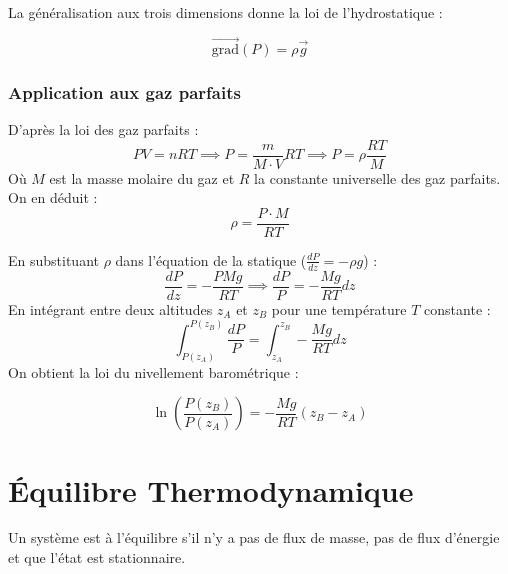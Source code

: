 \documentclass[french]{yLectureNote}
\renewcommand{\vec}{\overrightarrow}
\renewcommand{\vec}{\overrightarrow}
\begin{document}
La généralisation aux trois dimensions donne la loi de l'hydrostatique :

\begin{theorem}
    $$\vec{\text{grad}}(P) = \rho \vec{g}$$
\end{theorem}

\subsubsection{Application aux gaz parfaits}
D'après la loi des gaz parfaits :
\begin{equation}
PV = nRT \implies P = \frac{m}{M \cdot V} RT \implies P = \rho \frac{RT}{M}
\end{equation}
Où $M$ est la masse molaire du gaz et $R$ la constante universelle des gaz parfaits. On en déduit :
\begin{equation}
\rho = \frac{P \cdot M}{RT}
\end{equation}

En substituant $\rho$ dans l'équation de la statique ($\frac{dP}{dz} = -\rho g$) :
$$
\frac{dP}{dz} = -\frac{PMg}{RT} \implies \frac{dP}{P} = -\frac{Mg}{RT} dz
$$
En intégrant entre deux altitudes $z_A$ et $z_B$ pour une température $T$ constante :
\begin{equation}
\int_{P(z_A)}^{P(z_B)} \frac{dP}{P} = \int_{z_A}^{z_B} -\frac{Mg}{RT} dz
\end{equation}
On obtient la loi du nivellement barométrique :
\begin{theorem}
    $$\ln\left(\frac{P(z_B)}{P(z_A)}\right) = -\frac{Mg}{RT}(z_B - z_A)$$
\end{theorem}

\section{Équilibre Thermodynamique}
\begin{definition}
    Un système est à l'équilibre s'il n'y a pas de flux de masse, pas de flux d'énergie et que l'état est stationnaire.
\end{definition}
\end{document}
